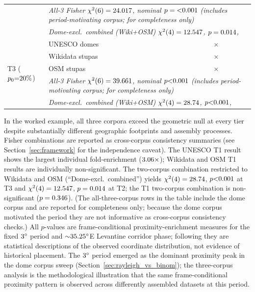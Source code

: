 \documentclass[12pt,a4paper]{article}
\newcommand{\degr}{\ifmmode^\circ\else\textdegree{}\fi}
\begin{document}
\begin{table}[ht]
\begin{tabular}{llrrrrrl}
  & \multicolumn{7}{l}{\textit{All-3 Fisher $\chi^2(6) = 24.017{}$, nominal $p = {<}0.001{}$ (includes period-motivating corpus; for completeness only)}} \\
  & \multicolumn{7}{l}{\textit{Dome-excl.\ combined (Wiki+OSM) $\chi^2(4) = 12.547{}$, $p = 0.014{}$, \geoFisherNcApSig{}}} \\
\midrule
\multirow{5}{*}{T3 ($p_0{=}20\%{}$)}
  & UNESCO domes    & \geoDomeAN{}   & \geoDomeAHits{}   & \geoDomeAExp{}   & \geoDomeAEnr{}$\times$   & \geoDomeAP{}   & \geoDomeASig{} \\
  & Wikidata stupas & \geoWikiAN{}   & \geoWikiAHits{}   & \geoWikiAExp{}   & \geoWikiAEnr{}$\times$   & \geoWikiAP{}   & \geoWikiASig{} \\
  & OSM stupas      & \geoOsmAN{}    & \geoOsmAHits{}    & \geoOsmAExp{}    & \geoOsmAEnr{}$\times$    & \geoOsmAP{}    & \geoOsmASig{} \\
  & \multicolumn{7}{l}{\textit{All-3 Fisher $\chi^2(6) = 39.661{}$, nominal $p {<}0.001{}$ (includes period-motivating corpus; for completeness only)}} \\
  & \multicolumn{7}{l}{\textit{Dome-excl.\ combined (Wiki+OSM) $\chi^2(4) = 28.74{}$, $p {<}0.001{}$, \geoFisherNcASig{}}} \\
\bottomrule
\end{tabular}
\end{table}

In the worked example, all three corpora exceed the geometric null at every tier
despite substantially different geographic footprints and assembly
processes. Fisher combinations are reported as cross-corpus consistency
summaries (see Section~\ref{sec:framework} for the independence caveat).
The UNESCO T1 result shows the
largest individual fold-enrichment ($3.06{}\times$); Wikidata and OSM T1 results
are individually non-significant. The two-corpus combination restricted to Wikidata and OSM
(``Dome-excl.\ combined'') yields
$\chi^2(4) = 28.74{}$, $p {<}0.001{}$ at T3 and $\chi^2(4) = 12.547{}$,
$p = 0.014{}$ at T2; the T1 two-corpus combination is
non-significant ($p = 0.346{}$). (The all-three-corpus rows in the table
include the dome corpus and are reported for completeness only; because the dome corpus motivated the
period they are not informative as cross-corpus consistency checks.)
All $p$-values are frame-conditional proximity-enrichment measures for the
fixed $3\degr$ period and ${\sim}35.25\degr$E Levantine corridor phase;
following \citet{silva2020statistical} they are statistical descriptions of
the observed coordinate distribution, not evidence of historical placement. The $3\degr$ period
emerged as the dominant proximity peak in the dome corpus sweep
(Section~\ref{sec:rayleigh_vs_binom}); the three-corpus analysis
is the methodological illustration that the same frame-conditional proximity
pattern is observed across differently assembled datasets at this period.
\end{document}

